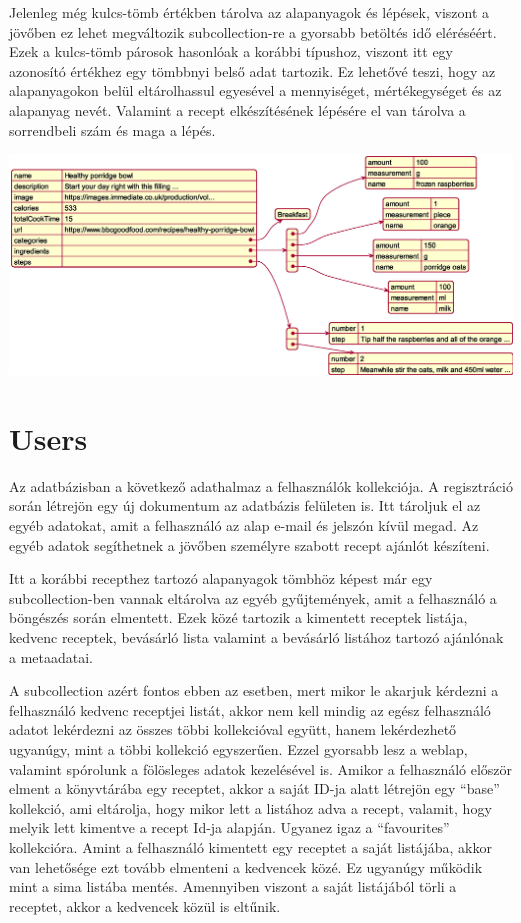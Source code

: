\documentclass[12pt]{report}
\theoremstyle{definition}
\begin{document}
Jelenleg még kulcs-tömb értékben tárolva az alapanyagok és lépések, viszont a jövőben ez lehet megváltozik subcollection-re a gyorsabb betöltés idő eléréséért. Ezek a kulcs-tömb párosok hasonlóak a korábbi típushoz, viszont itt egy azonosító értékhez egy tömbbnyi belső adat tartozik. Ez lehetővé teszi, hogy az alapanyagokon belül eltárolhassul egyesével a mennyiséget, mértékegységet és az alapanyag nevét. Valamint a recept elkészítésének lépésére el van tárolva a sorrendbeli szám és maga a lépés.

\noindent
\includegraphics[width=\textwidth]{out/diagrams/jsonRecipes/jsonRecipes.eps}

\section{Users}
Az adatbázisban a következő adathalmaz a felhasználók kollekciója. A regisztráció során létrejön egy új dokumentum az adatbázis felületen is. Itt tároljuk el az egyéb adatokat, amit a felhasználó az alap e-mail és jelszón kívül megad. Az egyéb adatok segíthetnek a jövőben személyre szabott recept ajánlót készíteni.

Itt a korábbi recepthez tartozó alapanyagok tömbhöz képest már egy subcollection-ben vannak eltárolva az egyéb gyűjtemények, amit a felhasználó a böngészés során elmentett. Ezek közé tartozik a kimentett receptek listája, kedvenc receptek, bevásárló lista valamint a bevásárló listához tartozó ajánlónak a metaadatai.

A subcollection azért fontos ebben az esetben, mert mikor le akarjuk kérdezni a felhasználó kedvenc receptjei listát, akkor nem kell mindig az egész felhasználó adatot lekérdezni az összes többi kollekcióval együtt, hanem lekérdezhető ugyanúgy, mint a többi kollekció egyszerűen. Ezzel gyorsabb lesz a weblap, valamint spórolunk a fölösleges adatok kezelésével is. Amikor a felhasználó először elment a könyvtárába egy receptet, akkor a saját ID-ja alatt létrejön egy “base” kollekció, ami eltárolja, hogy mikor lett a listához adva a recept, valamit, hogy melyik lett kimentve a recept Id-ja alapján. Ugyanez igaz a “favourites” kollekcióra. Amint a felhasználó kimentett egy receptet a saját listájába, akkor van lehetősége ezt tovább elmenteni a kedvencek közé. Ez ugyanúgy működik mint a sima listába mentés. Amennyiben viszont a saját listájából törli a receptet, akkor a kedvencek közül is eltűnik. 
\end{document}
